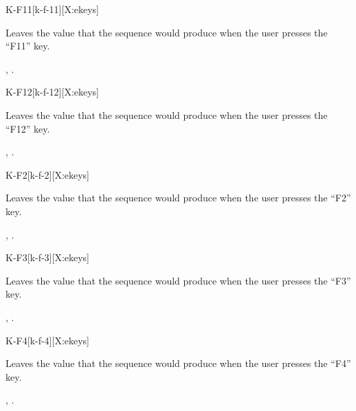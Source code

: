 \begin{worddef}{}{K-F11}[k-f-11][X:ekeys]
\item {}

	Leaves the value  that the sequence 
	 would produce when the user presses the
	``F11'' key.

\see {},
	.
\end{worddef}


\begin{worddef}{}{K-F12}[k-f-12][X:ekeys]
\item {}

	Leaves the value  that the sequence 
	 would produce when the user presses the
	``F12'' key.

\see {},
	.
\end{worddef}


\begin{worddef}{}{K-F2}[k-f-2][X:ekeys]
\item {}

	Leaves the value  that the sequence 
	 would produce when the user presses the
	``F2'' key.

\see {},
	.
\end{worddef}


\begin{worddef}{}{K-F3}[k-f-3][X:ekeys]
\item {}

	Leaves the value  that the sequence 
	 would produce when the user presses the
	``F3'' key.

\see {},
	.
\end{worddef}


\begin{worddef}{}{K-F4}[k-f-4][X:ekeys]
\item {}

	Leaves the value  that the sequence 
	 would produce when the user presses the
	``F4'' key.

\see {},
	.
\end{worddef}


